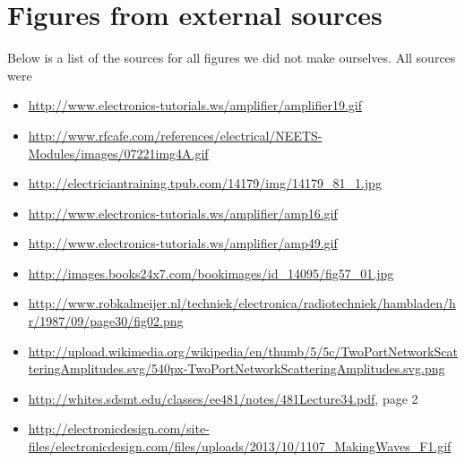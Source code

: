   \section{Figures from external sources}
  Below is a list of the sources for all figures we did not make ourselves. All sources were 
  \begin{itemize}
	  \item{ \url{http://www.electronics-tutorials.ws/amplifier/amplifier19.gif}}
	  \item{ \url{http://www.rfcafe.com/references/electrical/NEETS-Modules/images/07221img4A.gif}}
	  \item{ \url{http://electriciantraining.tpub.com/14179/img/14179_81_1.jpg}}
	  \item{ \url{http://www.electronics-tutorials.ws/amplifier/amp16.gif}}
	  \item{ \url{http://www.electronics-tutorials.ws/amplifier/amp49.gif}}
	  \item{ \url{http://images.books24x7.com/bookimages/id_14095/fig57_01.jpg}}
	  \item{ \url{http://www.robkalmeijer.nl/techniek/electronica/radiotechniek/hambladen/hr/1987/09/page30/fig02.png}}
	  \item{ \url{http://upload.wikimedia.org/wikipedia/en/thumb/5/5c/TwoPortNetworkScatteringAmplitudes.svg/540px-TwoPortNetworkScatteringAmplitudes.svg.png}}
	  \item{ \url{http://whites.sdsmt.edu/classes/ee481/notes/481Lecture34.pdf}, page 2}
	  \item{ \url{http://electronicdesign.com/site-files/electronicdesign.com/files/uploads/2013/10/1107_MakingWaves_F1.gif}}
  \end{itemize}
